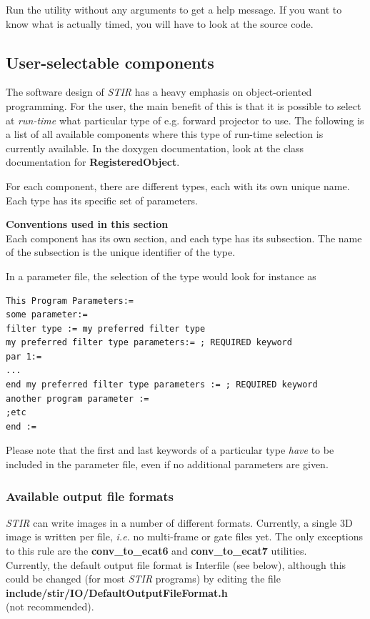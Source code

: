 \documentclass{article}
\begin{document}
{{Run the utility without any arguments to get a help message.
If you want to know what is actually timed, you will have to look at the source code.

\subsection{
User-selectable components}
\label{sec:user-selectablecomponents}
The software design of \textit{STIR} has a heavy emphasis on object-oriented 
programming. For the user, the main benefit of this is that it 
is possible to select at \textit{run-time} what particular type of 
e.g. forward projector to use. The following is a list of all 
available components where this type of run-time selection is 
currently available. In the doxygen documentation, look at the 
class documentation for \textbf{RegisteredObject}.


For each component, there are different types, each with its 
own unique name. Each type has its specific set of parameters. 

\textbf{Conventions used in this section}\\
Each component has its own section, and each type has its subsection. 
The name of the subsection is the unique identifier of the type.


In a parameter file, the selection of the type would look for 
instance as

\begin{verbatim}
This Program Parameters:=
some parameter:=
filter type := my preferred filter type 
my preferred filter type parameters:= ; REQUIRED keyword 
par 1:= 
... 
end my preferred filter type parameters := ; REQUIRED keyword
another program parameter :=
;etc
end :=
\end{verbatim}


Please note that the first and last keywords of a particular 
type \textit{have} to be included in the parameter file, even if no 
additional parameters are given.


\subsubsection{
Available output file formats}
\label{sec:outputfileformats}

\textit{STIR} can write images in a number of different formats. Currently, 
a single 3D image is written per file, \textit{i.e.} no multi-frame 
or gate files yet. The only exceptions to this rule are the \textbf{conv\_to\_ecat6} 
and \textbf{conv\_to\_ecat7} utilities.\\
Currently, the default output file format is Interfile (see below), 
although this could be changed (for most \textit{STIR} programs) by 
editing the file\\
 \textbf{include/stir/IO/DefaultOutputFileFormat.h}\\ 
(not recommended).

}}
\end{document}
